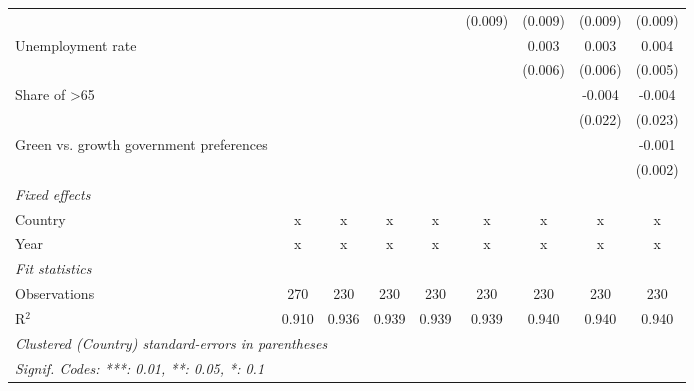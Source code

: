 \begin{table}[htbp]
\begin{tabular}{lcccccccc}
                                                             &         &         &               &               & (0.009)       & (0.009)       & (0.009)       & (0.009)\\   
      Unemployment rate                                      &         &         &               &               &               & 0.003         & 0.003         & 0.004\\   
                                                             &         &         &               &               &               & (0.006)       & (0.006)       & (0.005)\\   
      Share of >65                                           &         &         &               &               &               &               & -0.004        & -0.004\\   
                                                             &         &         &               &               &               &               & (0.022)       & (0.023)\\   
      Green vs. growth government preferences                &         &         &               &               &               &               &               & -0.001\\   
                                                             &         &         &               &               &               &               &               & (0.002)\\   
      \emph{Fixed effects}\\
      Country                                                & x       & x       & x             & x             & x             & x             & x             & x\\  
      Year                                                   & x       & x       & x             & x             & x             & x             & x             & x\\  
      \midrule \emph{Fit statistics}\\
      Observations                                           & 270     & 230     & 230           & 230           & 230           & 230           & 230           & 230\\  
      R$^2$                                                  & 0.910   & 0.936   & 0.939         & 0.939         & 0.939         & 0.940         & 0.940         & 0.940\\  
      \midrule
      \multicolumn{9}{l}{\emph{Clustered (Country) standard-errors in parentheses}}\\
      \multicolumn{9}{l}{\emph{Signif. Codes: ***: 0.01, **: 0.05, *: 0.1}}\\
   \end{tabular}
\end{table}


